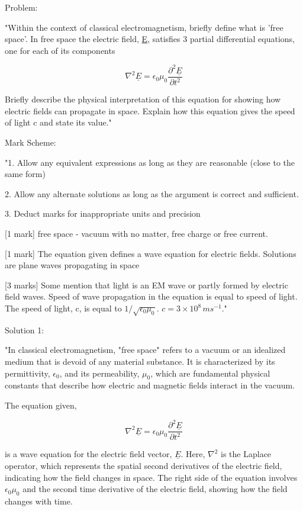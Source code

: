 Problem: 

"Within the context of classical electromagnetism, briefly define what is 'free space'. In free space the electric field, \underline{E}, satisfies 3 partial differential equations, one for each of its components

\[
\nabla^{2}\underline{E} =  \epsilon_{0}\mu_{0}\frac{\partial^2 \underline{E}}{\partial t^{2}}
\]

Briefly describe the physical interpretation of this equation for showing how electric fields can propagate in space. Explain how this equation gives the speed of light c and state its value." 

Mark Scheme:

"1. Allow any equivalent expressions as long as they are reasonable (close to the same form)

2. Allow any alternate solutions as long as the argument is correct and sufficient. 

3. Deduct marks for inappropriate units and precision

[1 mark] free space - vacuum with no matter, free charge or free current.

[1 mark] The equation given defines a wave equation for electric fields. Solutions are plane waves propagating in space

[3 marks] Some mention that light is an EM wave or partly formed by electric field waves. Speed of wave propagation in the equation is equal to speed of light. The speed of light, c,  is equal to \(1/\sqrt{\epsilon_{0}\mu_{0}}\). \(c = 3 \times 10^8 \, ms^{-1}\)."

Solution 1: 

"In classical electromagnetism, "free space" refers to a vacuum or an idealized medium that is devoid of any material substance. It is characterized by its permittivity, $\epsilon_{0}$, and its permeability, $\mu_{0}$, which are fundamental physical constants that describe how electric and magnetic fields interact in the vacuum.

The equation given,

\[
\nabla^{2}\underline{E} =  \epsilon_{0}\mu_{0}\frac{\partial^2 \underline{E}}{\partial t^{2}}
\]

is a wave equation for the electric field vector, $\underline{E}$. Here, $\nabla^{2}$ is the Laplace operator, which represents the spatial second derivatives of the electric field, indicating how the field changes in space. The right side of the equation involves $\epsilon_{0}\mu_{0}$ and the second time derivative of the electric field, showing how the field changes with time.


